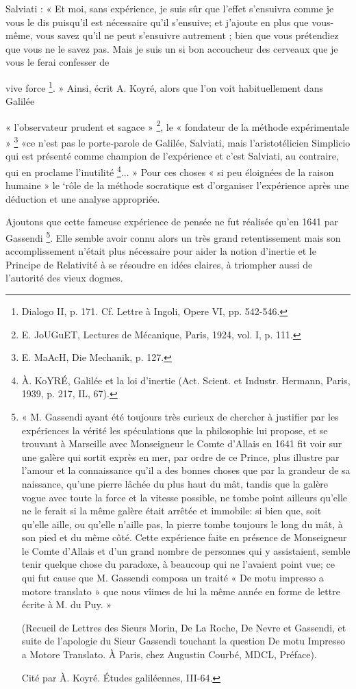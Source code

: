 Salviati : « Et moi, sans expérience, je suis sûr que l’effet s’ensuivra
comme je vous le dis puisqu'il est nécessaire qu’il s’ensuive; et
j'ajoute en plus que vous-même, vous savez qu’il ne peut s’ensuivre
autrement ; bien que vous prétendiez que vous ne le savez pas. Mais je
suis un si bon accoucheur des cerveaux que je vous le ferai confesser de

vive force \footnote{Dialogo II, p. 171. Cf. Lettre à Ingoli, Opere VI, pp. 542-546.}. »
Ainsi, écrit A. Koyré, alors que l’on voit habituellement dans Galilée

« l'observateur prudent et sagace » \footnote{E. JoUGuET, Lectures de Mécanique, Paris, 1924, vol. I, p. 111.}, le « fondateur de la méthode
expérimentale » \footnote{E. MaAcH, Die Mechanik, p. 127.} «ce n’est pas le porte-parole de Galilée, Salviati,
mais l’aristotélicien Simplicio qui est présenté comme champion de
l'expérience et c’est Salviati, au contraire, qui en proclame l’inutilité \footnote{À. KoYRÉ, Galilée et la loi d’inertie (Act. Scient. et Industr. Hermann,
Paris, 1939, p. 217, IL, 67).}... »
Pour ces choses « si peu éloignées de la raison humaine » le ‘rôle de la
méthode socratique est d’organiser l’expérience après une déduction et
une analyse appropriée.

Ajoutons que cette fameuse expérience de pensée ne fut réalisée qu’en
1641 par Gassendi \footnote{« M. Gassendi ayant été toujours très curieux de chercher à justifier par
les expériences la vérité les spéculations que la philosophie lui propose, et se trouvant
à Marseille avec Monseigneur le Comte d’Allais en 1641 fit voir sur une galère
qui sortit exprès en mer, par ordre de ce Prince, plus illustre par l’amour et la connaissance
qu’il a des bonnes choses que par la grandeur de sa naissance, qu’une
pierre lâchée du plus haut du mât, tandis que la galère vogue avec toute la force
et la vitesse possible, ne tombe point ailleurs qu’elle ne le ferait si la même galère
était arrêtée et immobile: si bien que, soit qu’elle aille, ou qu’elle n’aille pas, la
pierre tombe toujours le long du mât, à son pied et du même côté. Cette expérience
faite en présence de Monseigneur le Comte d’Allais et d’un grand nombre de
personnes qui y assistaient, semble tenir quelque chose du paradoxe, à beaucoup
qui ne l’avaient point vue; ce qui fut cause que M. Gassendi composa un traité
« De motu impresso a motore translato » que nous vîimes de lui la même année
en forme de lettre écrite à M. du Puy. »

(Recueil de Lettres des Sieurs Morin, De La Roche, De Nevre et Gassendi, et
suite de l’apologie du Sieur Gassendi touchant la question De motu Impresso a
Motore Translato. À Paris, chez Augustin Courbé, MDCL, Préface).

Cité par À. Koyré. Études galiléennes, III-64.}. Elle semble avoir connu alors un très grand
retentissement mais son accomplissement n’était plus nécessaire pour
aider la notion d’inertie et le Principe de Relativité à se résoudre en
idées claires, à triompher aussi de l’autorité des vieux dogmes.


